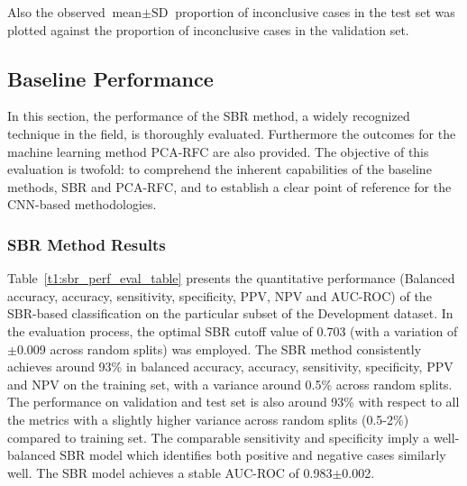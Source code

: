 Also the observed $\text{mean} \pm \text{SD}$ proportion of inconclusive cases in the test set was plotted 
against the proportion of inconclusive cases in the validation set.



\subsection{Baseline Performance}
\label{subsec:baseline_performance}

In this section, the performance of the SBR method, a widely recognized technique in the field, 
is thoroughly evaluated. 
Furthermore the outcomes for the machine learning method PCA-RFC are also provided.
The objective of this evaluation is twofold: to comprehend the inherent capabilities of the baseline methods, SBR and
PCA-RFC, and to establish a clear point of reference for the CNN-based methodologies.

\subsubsection{SBR Method Results}
\label{subsubsec:eval_sbr}




Table~\ref{t1:sbr_perf_eval_table} presents the quantitative performance 
(Balanced accuracy, accuracy, sensitivity, specificity, PPV, NPV and AUC-ROC) of the SBR-based classification on the 
particular subset of the Development dataset.
In the evaluation process, the optimal SBR cutoff value of 0.703 (with a variation of $\pm$0.009 across random splits) 
was employed.
The SBR method consistently achieves around 93\% in balanced accuracy, accuracy, sensitivity, specificity, PPV and NPV 
on the training set, with a variance around 0.5\% across random splits.
The performance on validation and test set is also around 93\% with respect to all the metrics
with a slightly higher variance across random splits (0.5-2\%) compared to training set.
The comparable sensitivity and specificity imply a well-balanced SBR model which 
identifies both positive and negative cases similarly well.
The SBR model achieves a stable AUC-ROC of 0.983$\pm$0.002.


